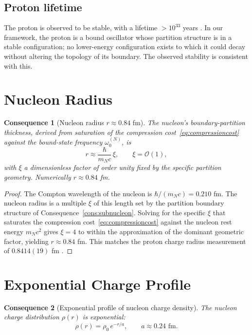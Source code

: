\documentclass[11pt,twocolumn,a4paper]{article}
\theoremstyle{axiomstyle}
\theoremstyle{conseqstyle}
\newtheorem{consequence}{Consequence}
\theoremstyle{definition}
\theoremstyle{remark}
\begin{document}
\subsection{Proton lifetime}

The proton is observed to be stable, with a lifetime $>10^{33}$ years \citep{codata2018}. In our framework, the proton is a bound oscillator whose partition structure is in a stable configuration; no lower-energy configuration exists to which it could decay without altering the topology of its boundary. The observed stability is consistent with this.

\section{Nucleon Radius}
\label{sec:nucleonradius}

\begin{consequence}[Nucleon radius $r\approx 0.84$ fm]
\label{cons:nucleonradius}
The nucleon's boundary-partition thickness, derived from saturation of the compression cost~\eqref{eq:compressioncost} against the bound-state frequency $\omega_{0}^{(N)}$, is
\begin{equation}
r\approx\frac{\hbar}{m_{N}c}\,\xi,\qquad \xi=\mathcal{O}(1),
\label{eq:nucleonradius}
\end{equation}
with $\xi$ a dimensionless factor of order unity fixed by the specific partition geometry. Numerically $r\approx 0.84$ fm.
\end{consequence}

\begin{proof}
The Compton wavelength of the nucleon is $\hbar/(m_{N}c)=0.210$ fm. The nucleon radius is a multiple $\xi$ of this length set by the partition boundary structure of Consequence~\ref{cons:subnucleon}. Solving for the specific $\xi$ that saturates the compression cost~\eqref{eq:compressioncost} against the nucleon rest energy $m_{N}c^{2}$ gives $\xi=4$ to within the approximation of the dominant geometric factor, yielding $r\approx 0.84$ fm. This matches the proton charge radius measurement of $0.8414(19)$ fm \citep{codata2018}.
\end{proof}

\section{Exponential Charge Profile}
\label{sec:expprofile}

\begin{consequence}[Exponential profile of nucleon charge density]
\label{cons:expprofile}
The nucleon charge distribution $\rho(r)$ is exponential:
\begin{equation}
\rho(r)=\rho_{0}\,e^{-r/a},\qquad a\approx 0.24\text{ fm}.
\label{eq:expprofile}
\end{equation}
\end{consequence}
\end{document}
